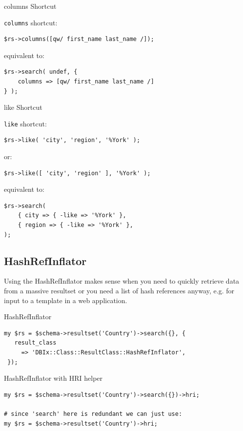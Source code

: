 \begin{frame}[fragile]{columns Shortcut}

\verb|columns| shortcut:

\begin{lstlisting}
$rs->columns([qw/ first_name last_name /]);
\end{lstlisting}

equivalent to:

\begin{lstlisting}
$rs->search( undef, { 
    columns => [qw/ first_name last_name /] 
} );
\end{lstlisting}
\end{frame}

\begin{frame}[fragile]{like Shortcut}

\verb|like| shortcut:

\begin{lstlisting}
$rs->like( 'city', 'region', '%York' );
\end{lstlisting}

or:

\begin{lstlisting}
$rs->like([ 'city', 'region' ], '%York' );
\end{lstlisting}

equivalent to:

\begin{lstlisting}
$rs->search(
    { city => { -like => '%York' },
    { region => { -like => '%York' },
);
\end{lstlisting}
\end{frame}

\subsection{HashRefInflator}

Using the HashRefInflator makes sense when you need to quickly retrieve
data from a massive resultset or you need a list of hash references anyway,
e.g. for input to a template in a web application.

\begin{frame}[fragile]{HashRefInflator}
\begin{lstlisting}
my $rs = $schema->resultset('Country')->search({}, {
   result_class
     => 'DBIx::Class::ResultClass::HashRefInflator',
 });
\end{lstlisting}
\end{frame}

\begin{frame}[fragile]{HashRefInflator with HRI helper}
\begin{lstlisting}
my $rs = $schema->resultset('Country')->search({})->hri;

# since 'search' here is redundant we can just use:
my $rs = $schema->resultset('Country')->hri;
\end{lstlisting}
\end{frame}

